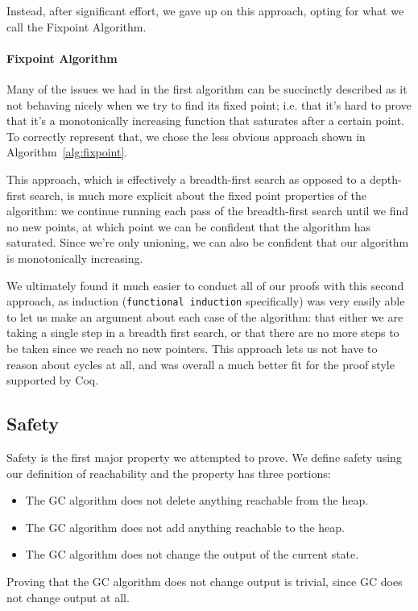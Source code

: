 \documentclass{article}
\begin{document}
Instead, after significant effort, we gave up on this approach, opting for what we call the Fixpoint Algorithm.

\paragraph{Fixpoint Algorithm}
Many of the issues we had in the first algorithm can be succinctly described as it not behaving nicely when we try to find its fixed point; i.e. that it's hard to prove that it's a monotonically increasing function that saturates after a certain point. To correctly represent that, we chose the less obvious approach shown in Algorithm~\ref{alg:fixpoint}.

This approach, which is effectively a breadth-first search as opposed to a depth-first search, is much more explicit about the fixed point properties of the algorithm: we continue running each pass of the breadth-first search until we find no new points, at which point we can be confident that the algorithm has saturated. Since we're only unioning, we can also be confident that our algorithm is monotonically increasing.

We ultimately found it much easier to conduct all of our proofs with this second approach, as induction (\lstinline|functional induction| specifically) was very easily able to let us make an argument about each case of the algorithm: that either we are taking a single step in a breadth first search, or that there are no more steps to be taken since we reach no new pointers. This approach lets us not have to reason about cycles at all, and was overall a much better fit for the proof style supported by Coq.


\subsection{Safety}
Safety is the first major property we attempted to prove. We define safety using our definition of reachability and the property has three portions:
\begin{itemize}
    \item The GC algorithm does not delete anything reachable from the heap.
    \item The GC algorithm does not add anything reachable to the heap.
    \item The GC algorithm does not change the output of the current state.
\end{itemize}

Proving that the GC algorithm does not change output is trivial, since GC does not change output at all.
\end{document}
